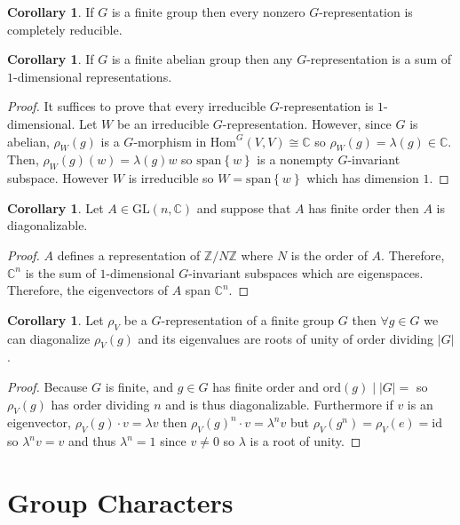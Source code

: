 \documentclass[12pt]{extarticle}
\newcommand{\divides}{\mid}
\newcommand{\Z}{\mathbb{Z}}
\newcommand{\C}{\mathbb{C}}
\newcommand{\ord}[1]{\mathrm{ord}\! \left(#1 \right)}
\newcommand{\vspan}[1]{\mathrm{span}\! \left\{#1 \right\}}
\newcommand{\id}{\mathrm{id}}
\newcommand{\GL}[2]{\mathrm{GL}(#1, #2)}
\newcommand{\repHom}[3]{\mathrm{Hom}^{#1} \left( #2, #3 \right)}
\theoremstyle{definition}
\newtheorem{corollary}[theorem]{Corollary}
\begin{document}
\begin{corollary}
If $G$ is a finite group then every nonzero $G$-representation is completely reducible. 
\end{corollary}

\begin{corollary}
If $G$ is a finite abelian group then any $G$-representation is a sum of $1$-dimensional representations.
\end{corollary}

\begin{proof}
It suffices to prove that every irreducible $G$-representation is $1$-dimensional. Let $W$ be an irreducible $G$-representation. However, since $G$ is abelian, $\rho_W(g)$ is a $G$-morphism in $\repHom{G}{V}{V} \cong \C$ so $\rho_W(g) = \lambda(g) \in \C$. Then, $\rho_W(g)(w) = \lambda(g) w$ so $\vspan{w}$ is a nonempty $G$-invariant subspace. However $W$ is irreducible so $W = \vspan{w}$ which has dimension $1$.
\end{proof}

\begin{corollary}
Let $A \in \GL{n}{\C}$ and suppose that $A$ has finite order then $A$ is diagonalizable. 
\end{corollary}

\begin{proof}
$A$ defines a representation of $\Z / N \Z$ where $N$ is the order of $A$. Therefore, $\C^n$ is the sum of $1$-dimensional $G$-invariant subspaces which are eigenspaces. Therefore, the eigenvectors of $A$ span $\C^n$. 
\end{proof}

\begin{corollary}
Let $\rho_V$ be a $G$-representation of a finite group $G$ then $\forall g \in G$ we can diagonalize $\rho_V(g)$ and its eigenvalues are roots of unity of order dividing $|G|$.
\end{corollary}

\begin{proof}
Because $G$ is finite, and $g \in G$ has finite order and $\ord{g} \divides |G| = $ so $\rho_V(g)$ has order dividing $n$ and is thus diagonalizable. Furthermore if $v$ is an eigenvector, $\rho_V(g) \cdot v = \lambda v$ then $\rho_V(g)^n \cdot v = \lambda^n v$ but $\rho_V(g^n) = \rho_V(e) = \id$ so $\lambda^n v = v$ and thus $\lambda^n = 1$ since $v \neq 0$ so $\lambda$ is a root of unity. 
\end{proof}

\section{Group Characters}
\end{document}
